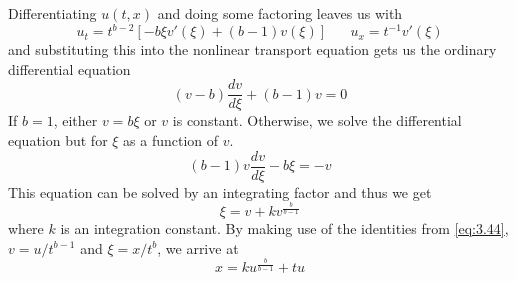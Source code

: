 \documentclass{article}
\newcommand{\od}[2]{\frac{d #1}{d #2}}
\numberwithin{equation}{section}
\begin{document}
Differentiating $u(t,x)$ and doing some factoring leaves us with 
\begin{equation}
    u_t =t^{b-2}[-b\xi v'(\xi)+(b-1)v(\xi)] \hspace{20pt} u_x=t^{-1}v'(\xi)
\end{equation}
and substituting this into the nonlinear transport equation gets us the ordinary differential equation
\begin{equation}
    (v-b)\od{v}{\xi} +(b-1)v=0
\end{equation}
If $b=1$, either $v=b\xi$ or $v$ is constant. Otherwise, we solve the differential equation but for $\xi$ as a function of $v$. 
\begin{equation*}
    (b-1)v\od{v}{\xi} -b\xi=-v
\end{equation*}
This equation can be solved by an integrating factor and thus we get 
\begin{equation*}
    \xi=v+kv^\frac{b}{b-1}
\end{equation*}
where $k$ is an integration constant. By making use of the identities from \eqref{eq:3.44}, $v=u/t^{b-1}$ and $\xi =x/t^b$, we arrive at 
\begin{equation*}
    x=ku^\frac{b}{b-1}+tu
\end{equation*}
\end{document}
